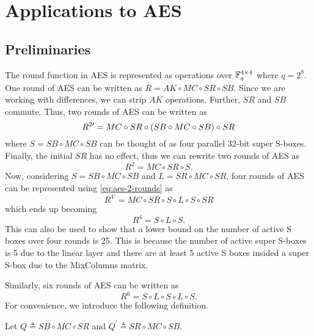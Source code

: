 \documentclass[twoside]{article}
\begin{document}
\section{Applications to AES}

\subsection{Preliminaries}

The round function in AES is represented as operations over \(\mathbb F_q^{4 \times
4}\) where \(q = 2^8\). One round of AES can be written as \(R = AK \circ MC
\circ SR \circ SB\). Since we are working with differences, we can strip \(AK\)
operations. Further, \(SR\) and \(SB\) commute. Thus, two rounds of AES can be
written as
\begin{equation}
    R^{2\prime} = MC \circ SR \circ (SB \circ MC \circ SB) \circ SR
    \label{eq:aes-2-rounds}
\end{equation}
where \(S = SB \circ MC \circ SB\) can be thought of as four parallel 32-bit
super S-boxes. Finally, the initial \(SR\) has no effect, thus we can rewrite
two rounds of AES as
\begin{equation}
    R^2 = MC \circ SR \circ S.
\end{equation}
Now, considering \(S = SB \circ MC \circ SB\) and \(L = SR \circ MC \circ SR\),
four rounds of AES can be represented using \eqref{eq:aes-2-rounds} as
\begin{equation}
    R^{4\prime} = MC \circ SR \circ S \circ L \circ S \circ SR
\end{equation}
which ends up becoming
\begin{equation}
    R^4 = S \circ L \circ S.
\end{equation}
This can also be used to show that a lower bound on the number of active S boxes
over four rounds is 25. This is because the number of active super S-boxes is 5
due to the linear layer and there are at least 5 active S boxes insided a super
S-box due to the MixColumns matrix.

Similarly, six rounds of AES can be written as
\begin{equation}
    R^6 = S \circ L \circ S \circ L \circ S.
\end{equation}
For convenience, we introduce the following definition.

\begin{definition}
    \label{def:q}
    Let \(Q \triangleq SB \circ MC \circ SR\) and \(Q^\prime \triangleq SR \circ
    MC \circ SB\).
\end{definition}
\end{document}
